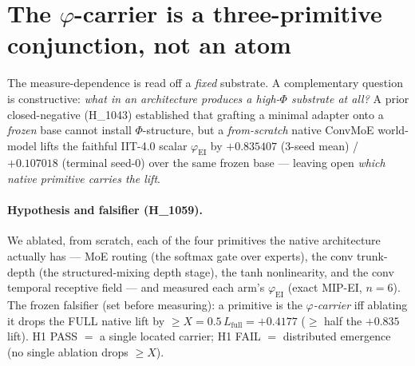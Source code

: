 \documentclass[11pt,a4paper]{article}
\newcommand{\faithful}{\ensuremath{\varphi_{\mathrm{EI}}}}
\begin{document}
\section{The $\varphi$-carrier is a three-primitive conjunction, not an atom}
\label{sec:carrier}

The measure-dependence is read off a \emph{fixed} substrate. A complementary
question is constructive: \emph{what in an architecture produces a high-$\Phi$
substrate at all?} A prior closed-negative (H\_1043) established that grafting a
minimal adapter onto a \emph{frozen} base cannot install $\Phi$-structure, but a
\emph{from-scratch} native ConvMoE world-model lifts the faithful IIT-4.0 scalar
\faithful{} by $+0.835407$ (3-seed mean) / $+0.107018$ (terminal seed-0) over the
same frozen base --- leaving open \emph{which native primitive carries the lift}.

\paragraph{Hypothesis and falsifier (H\_1059).} We ablated, from scratch, each of
the four primitives the native architecture actually has --- MoE routing (the
softmax gate over experts), the conv trunk-depth (the structured-mixing depth
stage), the tanh nonlinearity, and the conv temporal receptive field --- and
measured each arm's \faithful{} (exact MIP-EI, $n=6$). The frozen falsifier
(set before measuring): a primitive is the \emph{$\varphi$-carrier} iff ablating
it drops the FULL native lift by $\ge X = 0.5\,L_{\mathrm{full}}=+0.4177$
($\ge$ half the $+0.835$ lift). H1 PASS $=$ a single located carrier; H1 FAIL
$=$ distributed emergence (no single ablation drops $\ge X$).
\end{document}
